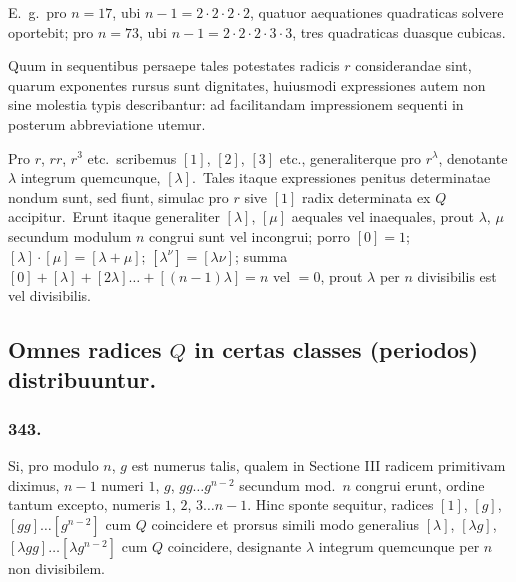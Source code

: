 \documentclass[12pt,a4paper]{article}
\theoremstyle{plain}
\theoremstyle{definition}
\theoremstyle{remark}
\begin{document}
E.\ g.\ pro $n=17$, ubi $n-1=2\cdot 2\cdot 2\cdot 2$, quatuor aequationes
quadraticas solvere oportebit; pro $n=73$, ubi $n-1=2\cdot 2\cdot 2\cdot 3\cdot 3$,
tres quadraticas duasque cubicas.

Quum in sequentibus persaepe tales potestates radicis $r$ considerandae
sint, quarum exponentes rursus sunt dignitates, huiusmodi expressiones autem
non sine molestia typis describantur: ad facilitandam impressionem sequenti
in posterum abbreviatione utemur.

Pro $r$, $rr$, $r^3$ etc.\ scribemus $[1]$, $[2]$, $[3]$ etc., generaliterque pro
$r^\lambda$, denotante $\lambda$ integrum quemcunque, $[\lambda]$.\ Tales itaque expressiones
penitus determinatae nondum sunt, sed fiunt, simulac pro $r$ sive $[1]$ radix
determinata ex $Q$ accipitur.\ Erunt itaque generaliter $[\lambda]$, $[\mu]$ aequales
vel inaequales, prout $\lambda$, $\mu$ secundum modulum $n$ congrui sunt vel
incongrui; porro $[0]=1$; $[\lambda]\cdot[\mu]=[\lambda+\mu]$; $[\lambda^\nu]=[\lambda\nu]$; summa
$[0]+[\lambda]+[2\lambda]\dots+[(n-1)\lambda] = n$ vel $=0$, prout $\lambda$ per $n$
divisibilis est vel divisibilis.

\subsection*{Omnes radices $Q$ in certas classes (periodos) distribuuntur.}

\subsubsection*{343.}

Si, pro modulo $n$, $g$ est numerus talis, qualem in Sectione III
radicem primitivam diximus, $n-1$ numeri $1$, $g$, $gg\dots g^{n-2}$ secundum
mod.\ $n$ congrui erunt, ordine tantum excepto, numeris $1$, $2$, $3\dots n-1$.
Hinc sponte sequitur, radices $[1]$, $[g]$, $[gg]\dots[g^{n-2}]$ cum $Q$
coincidere et prorsus simili modo generalius $[\lambda]$, $[\lambda g]$, $[\lambda gg]\dots[\lambda g^{n-2}]$
cum $Q$ coincidere, designante $\lambda$ integrum quemcunque per $n$ non
divisibilem.
\end{document}
